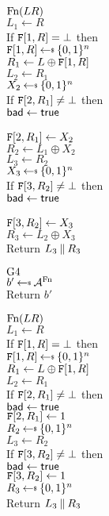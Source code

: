 \begin{figure}
{\underline{$\textnormal{Fn}(LR)$}\\
$L_1 \gets R$\\
If $\mathtt{F}[1,R] = \bot$ then\\
\ind $\TabF[1,R] \getsr \bits^n$\\
$R_1 \gets L \oplus \mathtt{F}[1,R]$\\
$L_2 \gets R_1$\\
$X_2 \getsr \bits^n$\\
If $\mathtt{F}[2,R_1] \ne \bot$ then\\
\ind $\mathsf{bad}\gets\mathsf{true}$\\
\ind {}\\
$\mathtt{F}[2,R_1] \gets X_2$\\
$R_2 \gets L_1 \oplus X_2$\\
$L_3 \gets R_2$\\
$X_3 \getsr \bits^n$\\
If $\mathtt{F}[3,R_2] \ne \bot$ then\\
\ind $\mathsf{bad}\gets\mathsf{true}$\\
\ind {}\\
$\mathtt{F}[3,R_2] \gets X_3$\\
$R_3 \gets L_2 \oplus X_3$\\
Return $L_3 \: \| \: R_3$
}{
\underline{${{\textnormal G}}4$}\\[2pt]
$b' \getsr \advA^\Fn$\\
Return $b'$\medskip

\underline{$\textnormal{Fn}(LR)$}\\
$L_1 \gets R$\\
If $\mathtt{F}[1,R] = \bot$ then\\
\ind $\TabF[1,R] \getsr \bits^n$\\
$R_1 \gets L \oplus \mathtt{F}[1,R]$\\
$L_2 \gets R_1$\\
If $\mathtt{F}[2,R_1] \ne \bot$ then\\
\ind $\mathsf{bad}\gets\mathsf{true}$\\
$\mathtt{F}[2,R_1] \gets 1$\\
$R_2 \getsr \bits^n$\\
$L_3 \gets R_2$\\
If $\mathtt{F}[3,R_2] \ne \bot$ then\\
\ind $\mathsf{bad}\gets\mathsf{true}$\\
$\mathtt{F}[3,R_2] \gets 1$\\
$R_3 \getsr \bits^n$\\
Return $L_3 \: \| \: R_3$
}
\end{figure}

